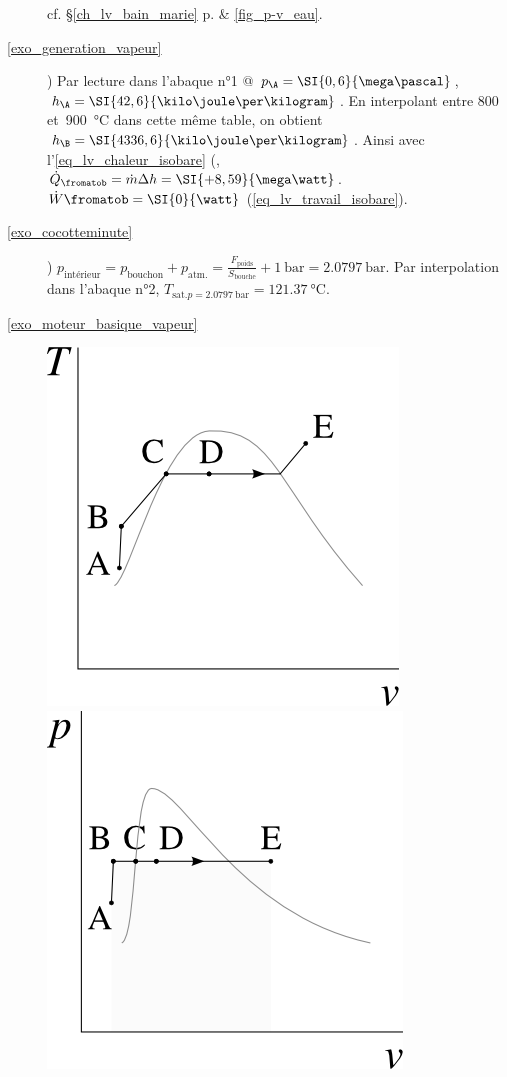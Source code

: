 \begin{description}
			\tab cf. \S\ref{ch_lv_bain_marie} p.\pageref{ch_lv_bain_marie} \& \cref{fig_p-v_eau}.
	\item [\ref{exo_generation_vapeur}]
			) Par lecture dans l’abaque n°1 @ $p_\A = \SI{0,6}{\mega\pascal}$, $h_\A = \SI{42,6}{\kilo\joule\per\kilogram}$. En interpolant entre \num{800} et~\SI{900}{\degreeCelsius} dans cette même table, on obtient $h_\B = \SI{4336,6}{\kilo\joule\per\kilogram}$. Ainsi avec l’\cref{eq_lv_chaleur_isobare} (, $\dot{Q}_\fromatob = \dot m \Delta h = \SI{+8,59}{\mega\watt}$. $\dot{W}\fromatob = \SI{0}{\watt}$ (\ref{eq_lv_travail_isobare}).
	\item [\ref{exo_cocotteminute}]
			) $p_\text{intérieur} = p_\text{bouchon} + p_\text{atm.} = \frac{F_\text{poids}}{S_\text{bouche}} + \SI{1}{\bar} = \SI{2,0797}{\bar}$. Par interpolation dans l’abaque n°2, $T_{\text{sat.} p=\SI{2,0797}{\bar}} = \SI{121,37}{\degreeCelsius}$.
	\item [\ref{exo_moteur_basique_vapeur}]
			\includegraphics[width=\solutiondiagramwidth]{images/exo_sol_tv_moteur_basique_1.png}
			\includegraphics[width=\solutiondiagramwidth]{images/exo_sol_pv_moteur_basique_2.png}

\end{description}
